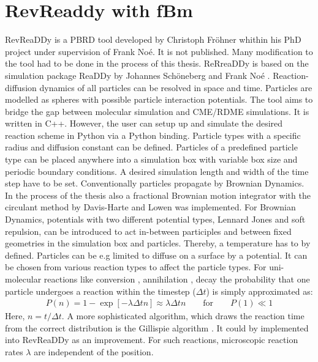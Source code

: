 \documentclass[
  a4paper,BCOR10mm,oneside,
  headsepline,footsepline,%
  fleqn,openbib
]{scrbook}
\begin{document}
\section{RevReaddy with fBm} 
RevReaDDy is a PBRD tool developed by Christoph Fröhner whithin his PhD project under supervision of Frank Noé. It is not published. Many modification to the tool had to be done in the process of this thesis. ReRreaDDy is based on the simulation package ReaDDy by Johannes Schöneberg and Frank Noé \cite{10.1371/journal.pone.0074261}. Reaction-diffusion dynamics of all particles can be resolved in space and time. Particles are modelled as spheres with possible particle interaction potentials. The tool aims to bridge the gap between molecular simulation and CME/RDME simulations. It is written in C++. However, the user can setup up and simulate the desired reaction scheme in Python via a Python binding. Particle types with a specific radius and diffusion constant can be defined. Particles of a predefined particle type can be placed anywhere into a simulation box with variable box size and periodic boundary conditions. A desired simulation length and width of the time step have to be set. Conventionally particles propagate by Brownian Dynamics. In the process of the thesis also a fractional Brownian motion integrator with the circulant method by Davis-Harte \cite{Dieker2004}  and Lowen \cite{Lowen1999} was implemented. For Brownian Dynamics, potentials with two different potential types, Lennard Jones and soft repulsion, can be introduced to act in-between participles and between fixed geometries in the simulation box and particles. Thereby, a temperature has to by defined. Particles can be e.g limited to diffuse on a surface by a potential. It can be chosen from various reaction types to affect the particle types. For uni-molecular reactions like conversion , annihilation , decay  the probability that one particle undergoes a reaction within the timestep ($\Delta t$) is simply approximated as:
\begin{align} \label{propabilityreaction}
 P(n)=1- \exp[-\lambda \Delta t n] \approx \lambda \Delta t n \qquad \text{for} \qquad P(1)\ll 1
\end{align}
Here, $n=t/\Delta t$. A more sophisticated algorithm, which draws the reaction time from the correct distribution is the Gillispie algorithm \cite{Gillespie1977}. It could by implemented into RevReaDDy as an improvement. For such reactions,  microscopic reaction rates $\lambda$ are independent of the position.
\end{document}

